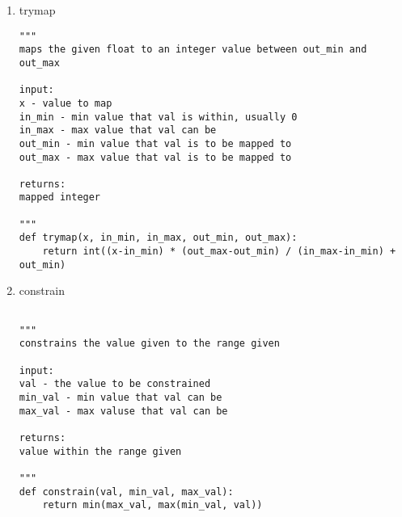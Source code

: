 \documentclass[11pt]{article}
\begin{document}
\begin{enumerate}
\item trymap
\label{sec:org9387039}
\begin{verbatim}
"""
maps the given float to an integer value between out_min and out_max

input:
x - value to map
in_min - min value that val is within, usually 0
in_max - max value that val can be
out_min - min value that val is to be mapped to
out_max - max value that val is to be mapped to

returns:
mapped integer

"""
def trymap(x, in_min, in_max, out_min, out_max):
    return int((x-in_min) * (out_max-out_min) / (in_max-in_min) + out_min)
\end{verbatim}

\item constrain
\label{sec:org04aa451}
\begin{verbatim}

"""
constrains the value given to the range given

input:
val - the value to be constrained
min_val - min value that val can be
max_val - max valuse that val can be

returns:
value within the range given

"""
def constrain(val, min_val, max_val):
    return min(max_val, max(min_val, val))
\end{verbatim}
\end{enumerate}
\end{document}
